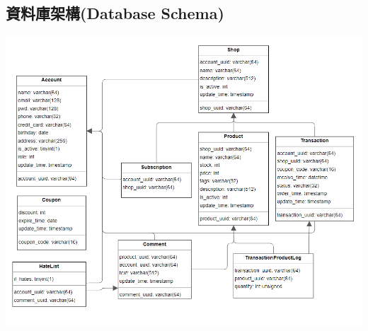 \documentclass[a4paper, 12pt]{article}
\begin{document}
\subsection{資料庫架構(Database Schema)}
\includegraphics[scale=0.7]{image/schema.png}
\newpage
\end{document}
